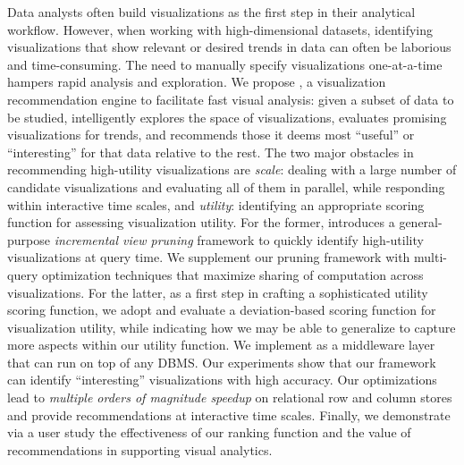 Data analysts often build visualizations
as the first step in their analytical workflow.
However, when working with high-dimensional datasets, identifying visualizations
that show relevant or desired trends in data can often be laborious and time-consuming.
The need to manually specify visualizations one-at-a-time hampers rapid analysis and exploration.
We propose \SeeDB, a visualization recommendation engine to facilitate fast 
visual analysis: 
given a subset of data to be studied, \SeeDB intelligently explores the 
space of visualizations, evaluates promising visualizations for trends, and 
recommends those it 
deems most ``useful'' or ``interesting'' for that data relative to the rest.
The two major obstacles in recommending high-utility visualizations are {\em scale}:
dealing with a large number of candidate visualizations and evaluating all of them in parallel, while
responding within interactive time scales, and {\em utility}: identifying 
an appropriate scoring function for assessing visualization utility.
For the former, \SeeDB introduces a general-purpose {\em incremental 
view pruning}
framework to quickly identify high-utility visualizations at query time.
We supplement our pruning framework with multi-query optimization techniques that maximize 
sharing of computation across visualizations.
For the latter, as a first step in crafting a sophisticated utility scoring function, 
we adopt and evaluate a 
deviation-based scoring function for visualization 
utility, while indicating how we may be able to generalize to capture more aspects
within our utility function.
We implement \SeeDB as a middleware layer that can run on top of any DBMS. 
Our experiments show that our framework can identify ``interesting'' visualizations with high accuracy. 
Our optimizations lead to 
{\em multiple orders of magnitude speedup} on relational row and column stores and provide
recommendations at interactive time scales.
Finally, we demonstrate via a user study the effectiveness of our ranking function
and the value of recommendations in supporting visual analytics. 
